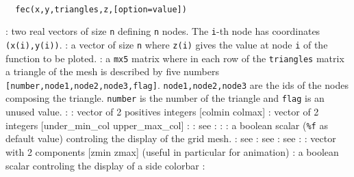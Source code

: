 \begin{mandesc}
  \\
\end{mandesc}
\begin{calling_sequence}
\begin{verbatim}
  fec(x,y,triangles,z,[option=value])
\end{verbatim}
\end{calling_sequence}
\begin{parameters}
  \begin{varlist}
    : two real vectors of size \verb!n! defining \verb!n! nodes.
    The \verb!i!-th node has coordinates \verb!(x(i),y(i))!.
    : a vector of size \verb!n! where \verb!z(i)!
    gives the value at node \verb!i! of the function to be ploted.
    : a \verb!mx5! matrix where in each row of the \verb!triangles! matrix
    a triangle of the mesh is described by five numbers \verb![number,node1,node2,node3,flag]!.
    \verb!node1,node2,node3! are the ids of the nodes composing the triangle.
    \verb!number! is the number of the triangle and \verb!flag! is an unused value.
    :
    : vector of 2 positives integers [colmin colmax]
    : vector of 2 integers [under\_min\_col upper\_max\_col]
    :
    : see 
    :
    :
    : a boolean scalar (\verb!%f! as default value) controling the display of the grid mesh.
    : see 
    : see 
    : see 
    :
    : vector with 2 components [zmin zmax] (useful in particular for animation)
    : a boolean scalar controling the display of a side colorbar
    :
  \end{varlist}
\end{parameters}
